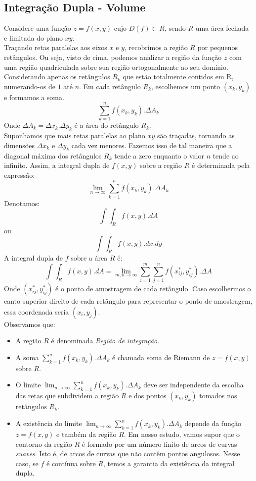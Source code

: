 \documentclass{article}
\begin{document}
		\subsection{Integração Dupla - Volume}		
			Considere uma função $z=f(x,y)$ cujo $D(f) \subset R$, sendo $R$ uma área fechada e limitada do plano $xy$.\\
			Traçando retas paralelas aos eixos $x$ e $y$, recobrimos a região $R$ por pequenos retângulos. Ou seja, visto de cima, podemos analizar a região da função $z$ com uma região quadriculada sobre sua região ortogonalmente ao seu domínio.\\
			Considerando apenas os retângulos $R_k$ que estão totalmente contidos em R, numerando-os de $1$ até $n$. Em cada retângulo $R_k$, escolhemos um ponto $(x_k,y_k)$ e formamos a soma.
			$$\sum_{k=1}^n f(x_k,y_k). \Delta A_k$$
			Onde $\Delta A_k=\Delta x_k.\Delta y_k$ é a área do retângulo $R_k$.\\
			Suponhamos que mais retas paralelas ao plano $xy$ são traçadas, tornando as dimensões $\Delta x_k$ e $\Delta y_k$ cada vez menores. Fazemos isso de tal maneira que a diagonal máxima dos retângulos $R_k$ tende a zero enquanto o valor $n$ tende ao infinito. Assim, a integral dupla de $f(x,y)$ sobre a região $R$ é determinada pela expressão:
			$$\lim_{n \to \infty} \sum_{k=1}^n f(x_k,y_k). \Delta A_k$$
			Denotamos:
			$$\int \int_R f(x,y).dA$$
			ou
			$$\int \int_R f(x,y).dx.dy$$
			A integral dupla de $f$ sobre a área $R$ é:
			$$\int \int_R f(x,y).dA = \lim_{m,n\to \infty} \sum_{i=1}^m \sum_{j=1}^n f(x_{ij}^*,y_{ij}^*).\Delta A$$
			Onde $(x_{ij}^*,y_{ij}^*)$ é o ponto de amostragem de cada retângulo. Caso escolhermos o canto superior direito de cada retângulo para representar o ponto de amostragem, essa coordenada seria $(x_i,y_j)$.\\
			Observamos que:
				\begin{itemize}
					\item A região $R$ é denominada \textit{Região de integração}.
					\item A soma $\sum_{k=1}^n f(x_k,y_k). \Delta A_k$ é chamada soma de Riemann de $z=f(x,y)$ sobre $R$.
					\item O limite $\lim_{n \to \infty} \sum_{k=1}^n f(x_k,y_k). \Delta A_k$ deve ser independente da escolha das retas que subdividem a região $R$ e dos pontos $(x_k,y_k)$ tomados nos retângulos $R_k$.
					\item A existência do limite $\lim_{n \to \infty} \sum_{k=1}^n f(x_k,y_k). \Delta A_k$ depende da função $z=f(x,y)$ e também da região $R$. Em nosso estudo, vamos supor que o contorno da região $R$ é formado por um número finito de arcos de curvas \textit{suaves}. Isto é, de arcos de curvas que não contêm pontos angulosos. Nesse caso, se $f$ é contínua sobre $R$, temos a garantia da existência da integral dupla.
				\end{itemize}
\end{document}
